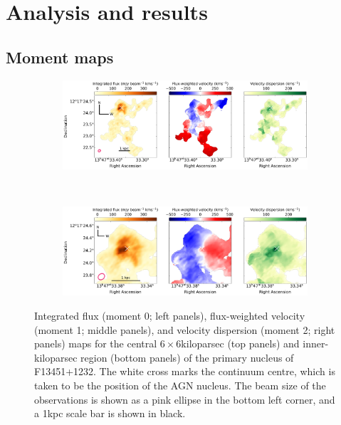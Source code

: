 \newpage

\section{Analysis and results}
\label{section: alma_f13451_1232: analysis_and_results}

\subsection{Moment maps}
\label{section: alma_f13451_1232: analysis_and_results: moment_maps}

\begin{figure}[!t]
    \centering
    \begin{subfigure}[]{\linewidth}
        \includegraphics[width=1\linewidth, trim={0 1.5cm 0 0}, clip]{figures/alma_f13451_1232/large_fov_moment_maps.pdf}
    \end{subfigure} \\
    \vspace*{\baselineskip}
    \begin{subfigure}[]{\linewidth}
        \includegraphics[width=1\linewidth, trim={0 0 0 2.93cm}, clip]{figures/alma_f13451_1232/moment_maps.pdf}
    \end{subfigure}
    \caption[Moment 0, 1, and 2 maps for the central kiloparsecs of the primary nucleus of F13451+1232.]{Integrated flux (moment 0; left panels), flux-weighted velocity (moment 1; middle panels), and velocity dispersion (moment 2; right panels) maps for the central $6\times6$\;kiloparsec (top panels) and inner-kiloparsec region (bottom panels) of the primary nucleus of F13451+1232. The white cross marks the continuum centre, which is taken to be the position of the AGN nucleus. The beam size of the observations is shown as a pink ellipse in the bottom left corner, and a 1\;kpc scale bar is shown in black.}
    \label{fig: alma_f13451_1232: moment_maps}
\end{figure}

